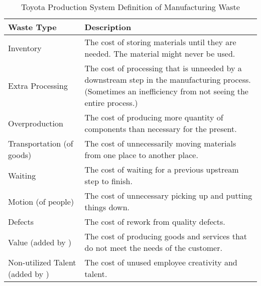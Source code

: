 \begin{table}[t]
\renewcommand{\arraystretch}{1.5}
\centering
\caption{Toyota Production System Definition of Manufacturing Waste}
\label{ManufacturingWaste}
\begin{tabular}{|p{2in}|p{4in}|} %
\hline
Waste Type                & Description                                                                                                                                                  \\ \hline
Inventory                 & The cost of storing materials until they are needed. The material might never be used.                                                                   \\ \hline
Extra Processing          & The cost of processing that is unneeded by a downstream step in the manufacturing process. (Sometimes an inefficiency from not seeing the entire process.) \\ \hline
Overproduction            & The cost of producing more quantity of components than necessary for the present.                                                                            \\ \hline
Transportation (of goods) & The cost of unnecessarily moving materials from one place to another place.                                                                                  \\ \hline
Waiting                   & The cost of waiting for a previous upstream step to finish.                                                                                                       \\ \hline
Motion (of people)        & The cost of unnecessary picking up and putting things down.                                                                                                  \\ \hline
Defects                   & The cost of rework from quality defects.                                                                                                                     \\ \hline
Value (added by \cite{WomackLeanThinking})                     & The cost of producing goods and services that do not meet the needs of the customer.                                                                         \\ \hline
Non-utilized Talent (added by \cite{LikerToyotaWay})      & The cost of unused employee creativity and talent.                                                                                                           \\ \hline
\end{tabular}
\end{table}


